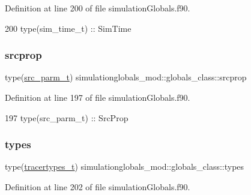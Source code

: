 Definition at line 200 of file simulation\+Globals.\+f90.


\begin{DoxyCode}
200         \textcolor{keywordtype}{type}(sim\_time\_t)    :: SimTime
\end{DoxyCode}
\mbox{\label{structsimulationglobals__mod_1_1globals__class_a3f6c36b781f6b2e6168362b764f54a68}} 
\subsubsection{\texorpdfstring{srcprop}{srcprop}}
{\footnotesize\ttfamily type(\mbox{\hyperlink{structsimulationglobals__mod_1_1src__parm__t}{src\+\_\+parm\+\_\+t}}) simulationglobals\+\_\+mod\+::globals\+\_\+class\+::srcprop\hspace{0.3cm}{\ttfamily [private]}}



Definition at line 197 of file simulation\+Globals.\+f90.


\begin{DoxyCode}
197         \textcolor{keywordtype}{type}(src\_parm\_t)    :: SrcProp
\end{DoxyCode}
\mbox{\label{structsimulationglobals__mod_1_1globals__class_a91ff3fbd87ca58c2d848291ebcfc926c}} 
\subsubsection{\texorpdfstring{types}{types}}
{\footnotesize\ttfamily type(\mbox{\hyperlink{structsimulationglobals__mod_1_1tracertypes__t}{tracertypes\+\_\+t}}) simulationglobals\+\_\+mod\+::globals\+\_\+class\+::types\hspace{0.3cm}{\ttfamily [private]}}



Definition at line 202 of file simulation\+Globals.\+f90.


